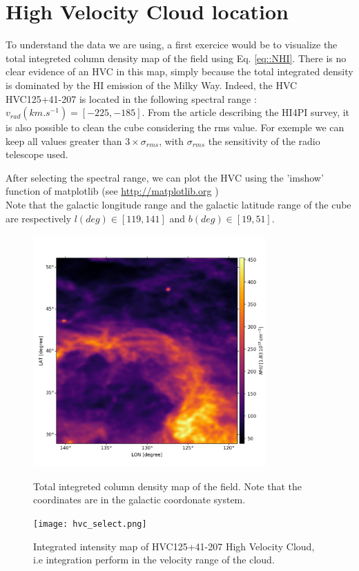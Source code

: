 \documentclass[a4paper,10.5pt]{report}
\begin{document}
\section{High Velocity Cloud location}
To understand the data we are using, a first exercice would be to visualize the total integreted column density map of the field
using Eq. \ref{eq::NHI}. There is no clear evidence of an HVC in this map, simply because the total integrated density is dominated
by the HI emission of the Milky Way. Indeed, the HVC HVC125+41-207 is located in the following spectral range : $v_{rad} (km.s^{-1}) = [-225, -185]$.
From the article describing the HI4PI survey, it is also possible to clean the cube considering the rms value. For exemple we can keep
all values greater than $3 \times \sigma_{rms}$, with $\sigma_{rms}$ the sensitivity of the radio telescope used.


After selecting the spectral range, we can plot the HVC using the 'imshow' function of matplotlib
(see \color{blue} \url{http://matplotlib.org} \color{black}) \\
Note that the galactic longitude range and the galactic latitude range of the cube are respectively
$l(deg) \in [119, 141]$ and $b(deg) \in [19, 51]$.

\begin{figure}[h!]
  \centering
  \includegraphics[width=3.5in]{field.png}
  \label{fig::hyperspectral}
  \caption{Total integreted column density map of the field. Note that the coordinates are in the galactic coordonate system.}
\end{figure}

\begin{figure}[h!]
  \centering
  \texttt{[image: hvc\_select.png]}
  \label{fig::hvc}
  \caption{Integrated intensity map of HVC125+41-207 High Velocity Cloud, i.e integration perform in the velocity range of the cloud.}
\end{figure}
\end{document}
